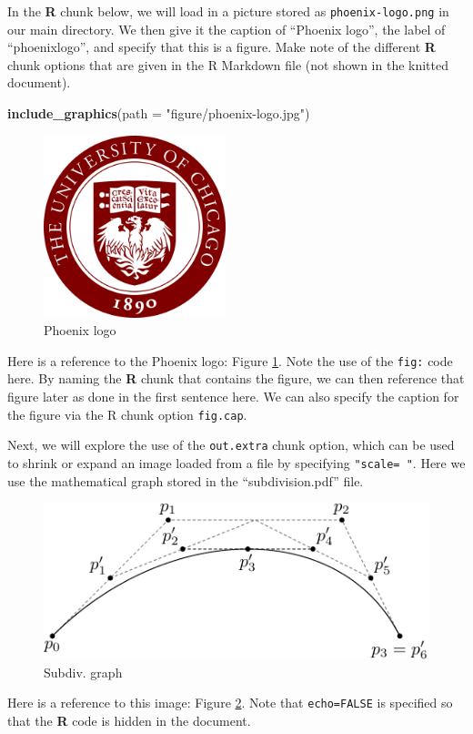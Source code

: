 \documentclass[12pt,oneside]{chicagocapstone}
\newenvironment{Shaded}{\begin{snugshade}}{\end{snugshade}}
\newcommand{\DataTypeTok}[1]{\textcolor[rgb]{0.13,0.29,0.53}{#1}}
\newcommand{\KeywordTok}[1]{\textcolor[rgb]{0.13,0.29,0.53}{\textbf{#1}}}
\newcommand{\NormalTok}[1]{#1}
\newcommand{\StringTok}[1]{\textcolor[rgb]{0.31,0.60,0.02}{#1}}
\begin{document}
In the \textbf{R} chunk below, we will load in a picture stored as \texttt{phoenix-logo.png} in our main directory. We then give it the caption of ``Phoenix logo'', the label of ``phoenixlogo'', and specify that this is a figure. Make note of the different \textbf{R} chunk options that are given in the R Markdown file (not shown in the knitted document).
\begin{Shaded}
\begin{Highlighting}[]
\KeywordTok{include_graphics}\NormalTok{(}\DataTypeTok{path =} \StringTok{"figure/phoenix-logo.jpg"}\NormalTok{)}
\end{Highlighting}
\end{Shaded}
\begin{figure}

{\centering \includegraphics[width=200px]{figure/phoenix-logo} 

}

\caption{Phoenix logo}\label{fig:phoenixlogo}
\end{figure}
Here is a reference to the Phoenix logo: Figure \ref{fig:phoenixlogo}. Note the use of the \texttt{fig:} code here. By naming the \textbf{R} chunk that contains the figure, we can then reference that figure later as done in the first sentence here. We can also specify the caption for the figure via the R chunk option \texttt{fig.cap}.

Next, we will explore the use of the \texttt{out.extra} chunk option, which can be used to shrink or expand an image loaded from a file by specifying \texttt{"scale=\ "}. Here we use the mathematical graph stored in the ``subdivision.pdf'' file.
\begin{figure}
\includegraphics[scale=0.75]{figure/subdivision} \caption{Subdiv. graph}\label{fig:subd}
\end{figure}
Here is a reference to this image: Figure \ref{fig:subd}. Note that \texttt{echo=FALSE} is specified so that the \textbf{R} code is hidden in the document.
\end{document}
